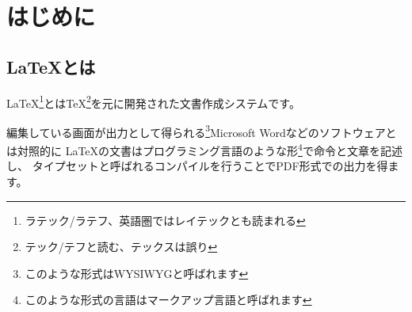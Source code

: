 \documentclass[uplatex,b5j]{jsbook}
\begin{document}
	\tableofcontents
	\clearpage

	\chapter{はじめに}
		
		\section{\LaTeX とは}
			\LaTeX \footnote{ラテック/ラテフ、英語圏ではレイテックとも読まれる}とは\TeX \footnote{テック/テフと読む、テックスは誤り}を元に開発された文書作成システムです。

			編集している画面が出力として得られる\footnote{このような形式はWYSIWYGと呼ばれます}Microsoft Wordなどのソフトウェアとは対照的に
			\LaTeX の文書はプログラミング言語のような形\footnote{このような形式の言語はマークアップ言語と呼ばれます}で命令と文章を記述し、
			タイプセットと呼ばれるコンパイルを行うことでPDF形式での出力を得ます。

		
\end{document}

